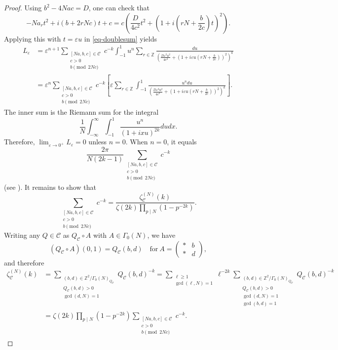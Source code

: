 \documentclass[12pt]{amsart}
\numberwithin{equation}{section}
\theoremstyle{definition}
\begin{document}
\begin{proof}
Using $b^{2}-4Nac=D$, one can check that
\begin{equation*}
-Na_{r}t^{2}+i(b+2rNc)t+c=c\left(\frac{D}{4c^{2}}t^{2}+\left(1+i\left(rN+\frac{b}{2c}\right)t\right)^{2}\right).
\end{equation*}
Applying this with $t=\varepsilon u$ in \eqref{eq-doublesum} yields
\begin{align}
L_{\varepsilon}&=\varepsilon^{n+1}\sum_{\substack{[Na,b,c]\in\mathcal{C} \\ c>0 \\ b\pmod{2Nc}}}c^{-k}\int_{-1}^{1}u^{n}\sum_{r\in\mathbb Z}\frac{du}{\left(\frac{D\varepsilon^{2}u^{2}}{4c^{2}}+\left(1+i\varepsilon u(rN+\frac{b}{2c})\right)^{2}\right)^{k}}\nonumber\\
&=\varepsilon^{n}\sum_{\substack{[Na,b,c]\in\mathcal{C} \\ c>0 \\ b\pmod{2Nc}}}c^{-k}\left[\varepsilon\sum_{r\in\mathbb{Z}}\int_{-1}^{1}\frac{u^{n}du}{\left(\frac{D\varepsilon^{2}u^{2}}{4c^{2}}+\left(1+i\varepsilon u(rN+\frac{b}{2c})\right)^{2}\right)^{k}}\right].\nonumber
\end{align}
The inner sum is the Riemann sum for the integral
$$\frac{1}{N}\int_{-\infty}^{\infty}\int_{-1}^{1}\frac{u^{n}}{(1+ixu)^{2k}}dudx.$$
Therefore, $\lim_{\varepsilon\rightarrow 0^{+}}L_{\varepsilon}=0$ unless $n=0$. When $n=0$, it equals
$$\frac{2\pi}{N(2k-1)}\sum_{\substack{[Na,b,c]\in\mathcal{C} \\ c>0 \\ b\pmod{2Nc}}}c^{-k}$$
(see \cite[p. 226]{KZ84}). 
It remains to show that
$$\sum_{\substack{[Na,b,c]\in\mathcal{C} \\ c>0 \\ b\pmod{2Nc}}}c^{-k}=\frac{\zeta_{\mathcal{C}}^{(N)}(k)}{\zeta(2k)\prod_{p\mid N}(1-p^{-2k})}.$$
Writing any $Q\in\mathcal{C}$ as $Q_{\mathcal{C}}\circ A$
with $A\in\Gamma_{0}(N)$, we have
$$(Q_{\mathcal{C}}\circ A)(0,1)=Q_{\mathcal{C}}(b,d)\quad\text{for}~A=\left(\begin{smallmatrix}
    * & b \\ * & d
\end{smallmatrix}\right),$$
and therefore
\begin{align*}
    \zeta_{\mathcal{C}}^{(N)}(k)&=\sum\limits_{\substack{(b,d)\in\mathbb{Z}^{2}/\Gamma_{0}(N)_{Q_{\mathcal{C}}} \\ Q_{\mathcal{C}}(b,d)>0 \\ \gcd(d,N)=1}}Q_{\mathcal{C}}(b,d)^{-k}=\sum\limits_{\substack{\ell\geq 1 \\ \gcd(\ell,N)=1}}\ell^{-2k}\sum\limits_{\substack{(b,d)\in\mathbb{Z}^{2}/\Gamma_{0}(N)_{Q_{\mathcal{C}}} \\ Q_{\mathcal{C}}(b,d)>0 \\ \gcd(d,N)=1 \\ \gcd(b,d)=1}}Q_{\mathcal{C}}(b,d)^{-k}\\
    &=\zeta(2k)\prod_{p\mid N}(1-p^{-2k})\sum_{\substack{[Na,b,c]\in\mathcal{C} \\ c>0 \\ b\pmod{2Nc}}}c^{-k}.
\end{align*}
\end{proof}
\end{document}
